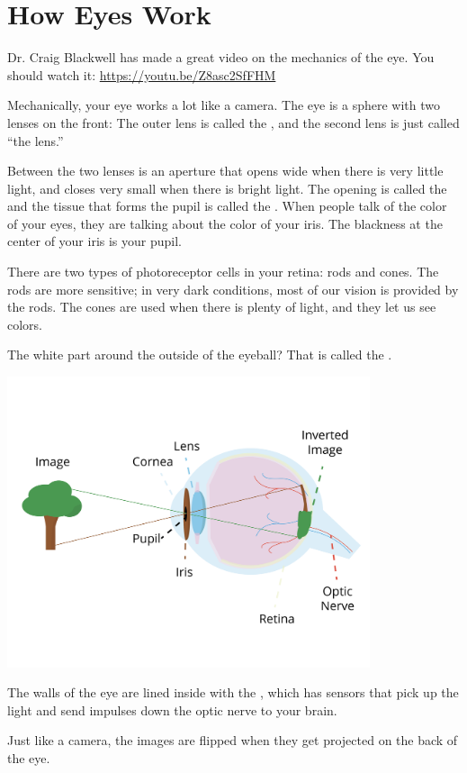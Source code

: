 \chapter{How Eyes Work}

Dr. Craig Blackwell has made a great video on the mechanics of the
eye. You should watch it: \url{https://youtu.be/Z8asc2SfFHM}

Mechanically, your eye works a lot like a camera.  The eye is a sphere
with two lenses on the front: The outer lens is called the , and the
second lens is just called ``the lens.''

Between the two lenses is an aperture that opens wide when there is
very little light, and closes very small when there is bright light.
The opening is called the  and the tissue that forms
the pupil is called the . When people talk of the color
of your eyes, they are talking about the color of your iris. The
blackness at the center of your iris is your pupil.

There are two types of photoreceptor cells in your retina: rods and
cones. The rods are more sensitive; in very dark conditions, most of
our vision is provided by the rods. The cones are used when there is
plenty of light, and they let us see colors.

The white part around the outside of the eyeball? That is called the
.

\includegraphics[width=0.8\textwidth]{eyeDiagram.png}

The walls of the eye are lined inside with the , which has
 sensors that pick up the light and send impulses down the optic
nerve to your brain.

Just like a camera, the images are flipped when they get projected on
the back of the eye.

